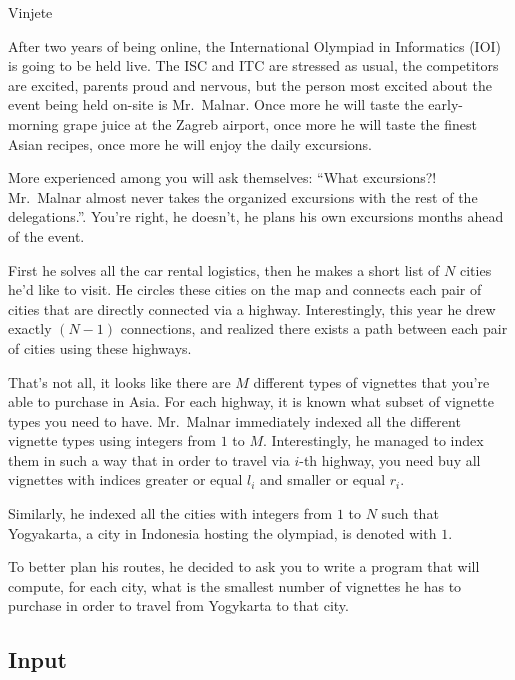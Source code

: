 \begin{statement}[
  problempoints=100,
  timelimit=3 seconds,
  memorylimit=512 MiB,
]{Vinjete}

After two years of being online, the International Olympiad in Informatics
(IOI) is going to be held live. The ISC and ITC are stressed as usual, the
competitors are excited, parents proud and nervous, but the person most
excited about the event being held on-site is Mr.\ Malnar. Once more he will
taste the early-morning grape juice at the Zagreb airport, once more he will
taste the finest Asian recipes, once more he will enjoy the daily excursions.

More experienced among you will ask themselves: ``What excursions?! Mr.\ Malnar
almost never takes the organized excursions with the rest of the delegations.''.
You're right, he doesn't, he plans his own excursions months ahead of the event.

First he solves all the car rental logistics, then he makes a short list of $N$
cities he'd like to visit. He circles these cities on the map and connects each
pair of cities that are directly connected via a highway. Interestingly, this
year he drew exactly $(N-1)$ connections, and realized there exists a path
between each pair of cities using these highways.

That's not all, it looks like there are $M$ different types of vignettes that
you're able to purchase in Asia. For each highway, it is known what subset of
vignette types you need to have. Mr.\ Malnar immediately indexed all the
different vignette types using integers from $1$ to $M$. Interestingly, he
managed to index them in such a way that in order to travel via $i$-th
highway, you need buy all vignettes with indices greater or equal $l_i$ and
smaller or equal $r_i$.

Similarly, he indexed all the cities with integers from $1$ to $N$ such that
Yogyakarta, a city in Indonesia hosting the olympiad, is denoted with $1$.

To better plan his routes, he decided to ask you to write a program that will
compute, for each city, what is the smallest number of vignettes he has
to purchase in order to travel from Yogykarta to that city.

\subsection*{Input}


\end{statement}
